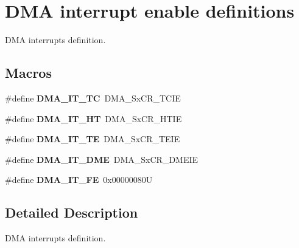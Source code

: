 \hypertarget{group___d_m_a__interrupt__enable__definitions}{}\section{D\+MA interrupt enable definitions}
\label{group___d_m_a__interrupt__enable__definitions}


D\+MA interrupts definition.  


\subsection*{Macros}
\begin{DoxyCompactItemize}
\item 
\mbox{\label{group___d_m_a__interrupt__enable__definitions_ga06e83dd277e0d3e5635cf8ce8dfd6e16}} 
\#define {\bfseries D\+M\+A\+\_\+\+I\+T\+\_\+\+TC}~D\+M\+A\+\_\+\+Sx\+C\+R\+\_\+\+T\+C\+IE
\item 
\mbox{\label{group___d_m_a__interrupt__enable__definitions_gadf11c572b9797e04a14b105fdc2e5f66}} 
\#define {\bfseries D\+M\+A\+\_\+\+I\+T\+\_\+\+HT}~D\+M\+A\+\_\+\+Sx\+C\+R\+\_\+\+H\+T\+IE
\item 
\mbox{\label{group___d_m_a__interrupt__enable__definitions_gaf9d92649d2a0146f663ff253d8f3b59e}} 
\#define {\bfseries D\+M\+A\+\_\+\+I\+T\+\_\+\+TE}~D\+M\+A\+\_\+\+Sx\+C\+R\+\_\+\+T\+E\+IE
\item 
\mbox{\label{group___d_m_a__interrupt__enable__definitions_ga71137443f7bdced1ee80697596e9ea98}} 
\#define {\bfseries D\+M\+A\+\_\+\+I\+T\+\_\+\+D\+ME}~D\+M\+A\+\_\+\+Sx\+C\+R\+\_\+\+D\+M\+E\+IE
\item 
\mbox{\label{group___d_m_a__interrupt__enable__definitions_ga93164ec039fc5579662c382e68d7d13f}} 
\#define {\bfseries D\+M\+A\+\_\+\+I\+T\+\_\+\+FE}~0x00000080U
\end{DoxyCompactItemize}


\subsection{Detailed Description}
D\+MA interrupts definition. 

